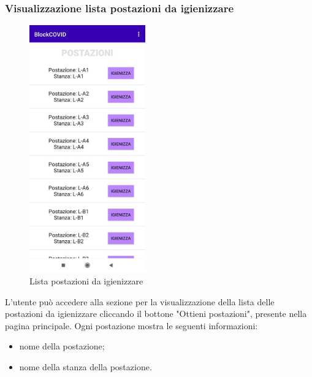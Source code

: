 	\subsubsection{Visualizzazione lista postazioni da igienizzare}
	\begin{figure}[H]
		\centering
		\includegraphics[width=5cm]{res/images/postazioniDaIgienizzareAddetto.png}
		\caption{Lista postazioni da igienizzare}
	\end{figure}	
	L’utente può accedere alla sezione per la visualizzazione della lista delle postazioni da igienizzare cliccando il bottone "Ottieni postazioni", presente nella pagina principale.
	Ogni postazione mostra le seguenti informazioni:
	\begin{itemize}
		\item nome della postazione;
		\item nome della stanza della postazione.
	\end{itemize}
